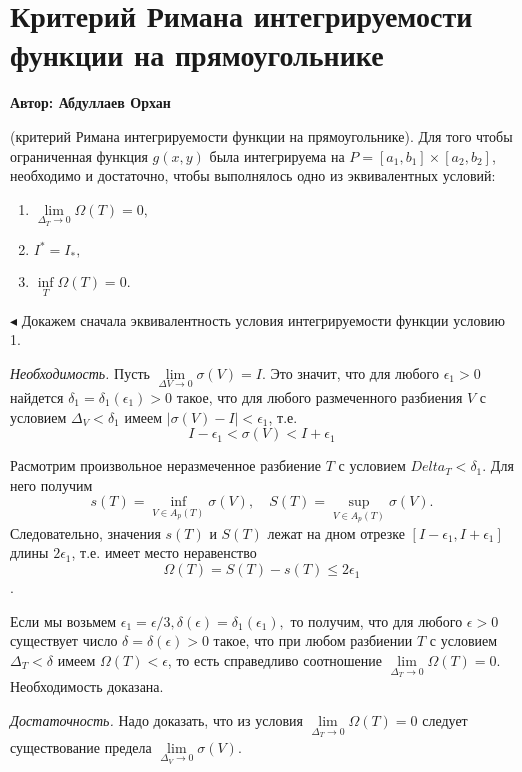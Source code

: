 \setcounter{object}{0}
\setcounter{approval}{0}
\setcounter{theorem}{0}
\setcounter{example}{0}
\chapter{Критерий Римана интегрируемости функции на прямоугольнике}
\vskip-1cm
\centerline{\bf Автор: Абдуллаев Орхан}\vskip 1cm

\begin{theorem}
(критерий Римана интегрируемости функции на прямоугольнике). Для того чтобы ограниченная функция $g(x, y)$ была интегрируема на $P=[a_1, b_1]\times[a_2, b_2]$, необходимо и достаточно, чтобы выполнялось одно из эквивалентных условий:
\begin{enumerate}
\item $\lim\limits_{\Delta_T\to 0}{\Omega(T)}=0,$
\item $I^*=I_*,$
\item $\inf\limits_T \Omega(T)=0.$
\end{enumerate}
\end{theorem}
$\blacktriangleleft$ Докажем сначала эквивалентность условия интегрируемости функции условию 1.
\par \emph{Необходимость.} Пусть $\lim\limits_{\Delta V\to 0}{\sigma (V)}=I.$ Это значит, что для любого $\epsilon_1>0$ найдется $\delta_1=\delta_1(\epsilon_1)>0$ такое, что для любого размеченного разбиения $V$ с условием $\Delta_V<\delta_1$ имеем $|\sigma(V)-I|<\epsilon_1$, т.е.
\begin{equation}
\label{trivial}
I-\epsilon_1<\sigma(V)<I+\epsilon_1
\end{equation}
\par Расмотрим произвольное неразмеченное разбиение $T$ с условием $Delta_T<\delta_1.$ Для него получим
$$s(T)=\inf\limits_{V\in A_p(T)}{\sigma(V)},\quad S(T)=\sup\limits_{V\in A_p(T)}{\sigma(V)}.$$
Следовательно, значения $s(T)$ и $S(T)$ лежат на дном отрезке $[I-\epsilon_1, I+\epsilon_1]$ длины $2\epsilon_1$, т.е. имеет место неравенство $$\Omega(T)=S(T)-s(T)\le 2\epsilon_1$$.
\par\parindent=1cm
Если мы возьмем $\epsilon_1=\epsilon/3, \delta(\epsilon)=\delta_1(\epsilon_1),$ то получим, что для любого $\epsilon>0$ существует число $\delta=\delta(\epsilon)>0$ такое, что при любом разбиении $T$ с условием $\Delta_T<\delta$ имеем $\Omega(T)<\epsilon$, то есть справедливо соотношение $\lim\limits_{\Delta_T\to 0}{\Omega(T)}=0$. Необходимость доказана.
\par\parindent=1cm
\emph{Достаточность.} Надо доказать, что из условия $\lim\limits_{\Delta_T\to 0}{\Omega(T)}=0$ следует существование предела $\lim\limits_{\Delta_V\to 0}{\sigma(V)}$.

